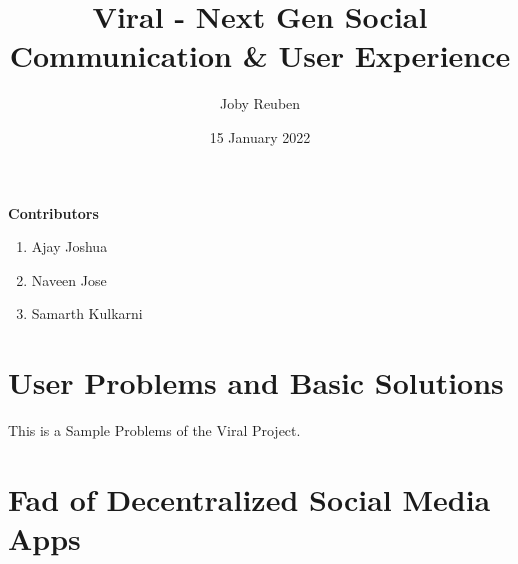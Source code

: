 \documentclass[10pt]{article}
\title{\textbf{Viral - Next Gen Social Communication \& User Experience}}
\date{15 January 2022}
\author{Joby Reuben}
\begin{document}
\maketitle

\begin{abstract}
\lipsum[1]\lipsum[1]
\end{abstract}

\vspace{5mm} %

\textbf{Contributors}
\begin{enumerate}
\item{Ajay Joshua}
\item{Naveen Jose}
\item {Samarth Kulkarni}
\end{enumerate}

\newpage
   \tableofcontents\pagebreak 
   
\section{User Problems and Basic Solutions}
This is a Sample Problems of the Viral Project.

\section{Fad of Decentralized Social Media Apps}
\end{document}
